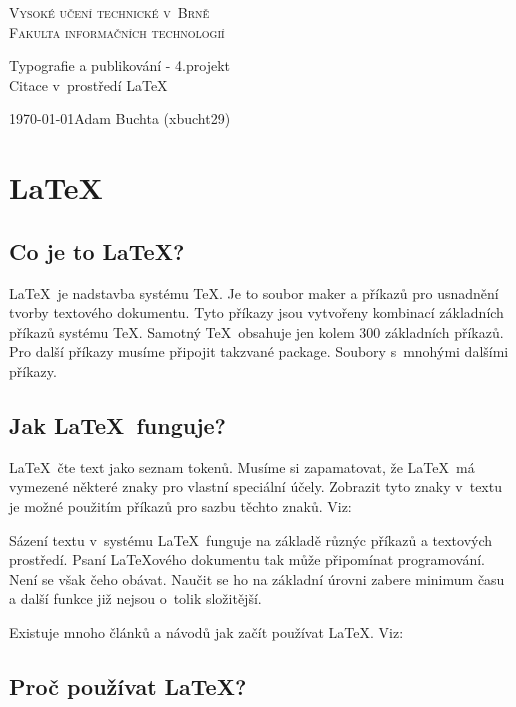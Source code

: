 \documentclass[a4paper, 11pt]{article}
\begin{document}
\begin{center}
\thispagestyle{empty}
  \Huge{\textsc{Vysoké učení technické v~Brně}} \\
  \huge{\textsc{Fakulta informačních technologií}}

  \LARGE{Typografie a publikování - 4.projekt}  \\
  \Huge{Citace v~prostředí \LaTeX }

\end{center}

  \Large{\today \hfill Adam Buchta (xbucht29)}
  \newpage
  \setcounter{page}{1}
  {\fontsize{11pt}{13pt}\selectfont
  \section{\LaTeX}
  \subsection{Co je to \LaTeX ?}
  \LaTeX ~je nadstavba systému \TeX. Je to soubor maker a příkazů pro usnadnění tvorby textového dokumentu. Tyto příkazy jsou vytvořeny kombinací základních příkazů systému \TeX . Samotný \TeX ~obsahuje jen kolem 300 základních příkazů. Pro další příkazy musíme připojit takzvané package. Soubory s~mnohými dalšími příkazy. \cite{ryb,boj}

  \subsection{Jak \LaTeX ~funguje?}

  \LaTeX ~čte text jako seznam tokenů. Musíme si zapamatovat, že \LaTeX ~má vymezené některé znaky pro vlastní speciální účely. Zobrazit tyto znaky v~textu je možné použitím příkazů pro sazbu těchto znaků. Viz: \cite{knu}

  Sázení textu v~systému \LaTeX ~funguje na základě různýc příkazů a textových prostředí. Psaní \LaTeX ového dokumentu tak může připomínat programování. Není se však čeho obávat. Naučit se ho na základní úrovni zabere minimum času a další funkce již nejsou o~tolik složitější. \cite{fou}

  Existuje mnoho článků a návodů jak začít používat \LaTeX. Viz: \cite{rob}

  \subsection{Proč používat \LaTeX ?}

}
\end{document}
